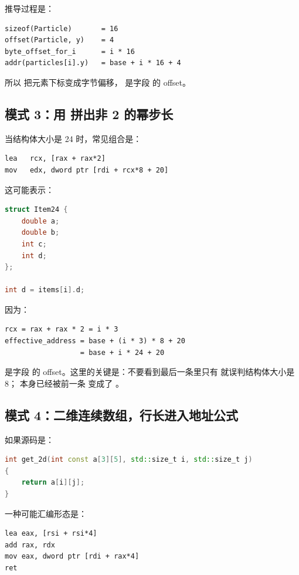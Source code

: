 推导过程是：

\begin{lstlisting}
sizeof(Particle)       = 16
offset(Particle, y)    = 4
byte_offset_for_i      = i * 16
addr(particles[i].y)   = base + i * 16 + 4
\end{lstlisting}

所以  把元素下标变成字节偏移， 是字段  的 offset。

\subsection{模式 3：用  拼出非 2 的幂步长}

当结构体大小是 24 时，常见组合是：

\begin{lstlisting}
lea   rcx, [rax + rax*2]
mov   edx, dword ptr [rdi + rcx*8 + 20]
\end{lstlisting}

这可能表示：

\begin{lstlisting}[language=C++]
struct Item24 {
    double a;
    double b;
    int c;
    int d;
};

int d = items[i].d;
\end{lstlisting}

因为：

\begin{lstlisting}
rcx = rax + rax * 2 = i * 3
effective_address = base + (i * 3) * 8 + 20
                  = base + i * 24 + 20
\end{lstlisting}

 是字段  的 offset。这里的关键是：不要看到最后一条里只有  就误判结构体大小是 8； 本身已经被前一条  变成了 。

\subsection{模式 4：二维连续数组，行长进入地址公式}

如果源码是：

\begin{lstlisting}[language=C++]
int get_2d(int const a[3][5], std::size_t i, std::size_t j)
{
    return a[i][j];
}
\end{lstlisting}

一种可能汇编形态是：

\begin{lstlisting}
lea eax, [rsi + rsi*4]
add rax, rdx
mov eax, dword ptr [rdi + rax*4]
ret
\end{lstlisting}

